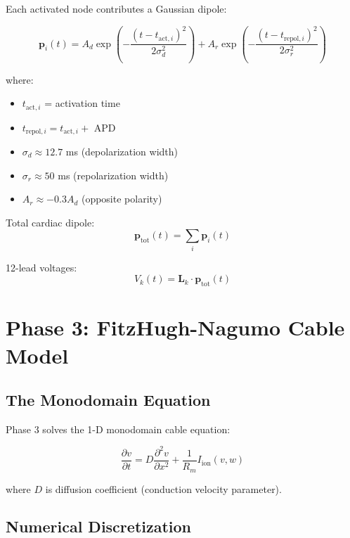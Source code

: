 \documentclass[12pt,oneside,a4paper]{book}
\begin{document}
Each activated node contributes a Gaussian dipole:

\begin{equation}
\mathbf{p}_i(t) = A_d \exp\left(-\frac{(t - t_{\text{act},i})^2}{2\sigma_d^2}\right) + A_r \exp\left(-\frac{(t - t_{\text{repol},i})^2}{2\sigma_r^2}\right)
\end{equation}

where:
\begin{itemize}
  \item $t_{\text{act},i}$ = activation time
  \item $t_{\text{repol},i} = t_{\text{act},i} +$ APD
  \item $\sigma_d \approx 12.7$ ms (depolarization width)
  \item $\sigma_r \approx 50$ ms (repolarization width)
  \item $A_r \approx -0.3 A_d$ (opposite polarity)
\end{itemize}

Total cardiac dipole:
$$\mathbf{p}_{\text{tot}}(t) = \sum_i \mathbf{p}_i(t)$$

12-lead voltages:
$$V_k(t) = \mathbf{L}_k \cdot \mathbf{p}_{\text{tot}}(t)$$


\chapter{Phase 3: FitzHugh-Nagumo Cable Model}

\section{The Monodomain Equation}

Phase 3 solves the 1-D monodomain cable equation:

\begin{equation}
\frac{\partial v}{\partial t} = D \frac{\partial^2 v}{\partial x^2} + \frac{1}{R_m} I_{\text{ion}}(v, w)
\label{eq:monodomain}
\end{equation}

where $D$ is diffusion coefficient (conduction velocity parameter).

\section{Numerical Discretization}
\end{document}
